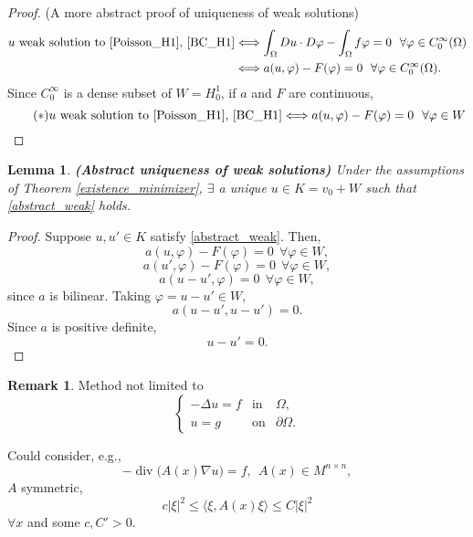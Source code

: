 \documentclass[12pt]{article}
\DeclareMathOperator{\diver}{div}
\newtheorem{lemma}{Lemma}[section]
\theoremstyle{definition}
\newtheorem*{remark}{Remark}
\begin{document}
\begin{proof}
(A more abstract proof of uniqueness of weak solutions)
\begin{align*}
u\text{ weak solution to \eqref{Poisson_H1}, \eqref{BC_H1}}&\Longleftrightarrow\int_\Omega Du\cdot D\varphi-\int_\Omega f\varphi=0\ \ \forall\varphi\in C_0^\infty(\Omega)\\
&\Longleftrightarrow a(u,\varphi)-F(\varphi)=0\ \ \forall\varphi\in C_0^\infty(\Omega).
\end{align*}
Since $C_0^\infty$ is a dense subset of $W=H_0^1$, if $a$ and $F$ are continuous,
\begin{equation}\tag{$*$}\label{abstract_weak}
u\text{ weak solution to \eqref{Poisson_H1}, \eqref{BC_H1}}\Longleftrightarrow a(u,\varphi)-F(\varphi)=0\ \ \forall\varphi\in W
\end{equation}
\end{proof}

\begin{lemma}\label{abstract_uniqueness}
\emph{\textbf{(Abstract uniqueness of weak solutions)}} Under the assumptions of Theorem \ref{existence_minimizer}, $\exists$ a unique $u\in K=v_0+W$ such that \eqref{abstract_weak} holds.
\end{lemma}

\begin{proof}
Suppose $u,u'\in K$ satisfy \eqref{abstract_weak}. Then,
\[a(u,\varphi)-F(\varphi)=0\ \ \forall\varphi\in W,\]
\[a(u',\varphi)-F(\varphi)=0\ \ \forall\varphi\in W,\]
\[a(u-u',\varphi)=0\ \ \forall\varphi\in W,\]
since $a$ is bilinear. Taking $\varphi=u-u'\in W$,
\[a(u-u',u-u')=0.\]
Since $a$ is positive definite,
\[u-u'=0.\]
\end{proof}

\begin{remark}
Method not limited to
\[\left\{\begin{array}{rcl}-\Delta u=f&\text{in}&\Omega,\\u=g&\text{on}&\partial\Omega.\end{array}\right.\]

Could consider, e.g.,
\[-\diver\big(A(x)\nabla u\big)=f,\ \ A(x)\in M^{n\times n},\]
$A$ symmetric,
\[c|\xi|^2\leq\langle\xi,A(x)\xi\rangle\leq C|\xi|^2\]
$\forall x$ and some $c,C'>0$.
\end{remark}
\end{document}
